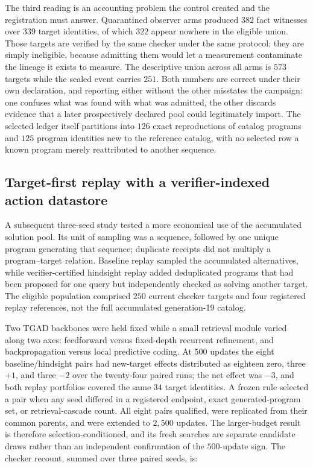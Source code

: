 \documentclass[11pt]{article}
\begin{document}
The third reading is an accounting problem the control created and the registration must
answer. Quarantined observer arms produced $382$ fact witnesses over $339$ target
identities, of which $322$ appear nowhere in the eligible union. Those targets are
verified by the same checker under the same protocol; they are simply ineligible, because
admitting them would let a measurement contaminate the lineage it exists to measure. The
descriptive union across all arms is $573$ targets while the sealed event carries $251$.
Both numbers are correct under their own declaration, and reporting either without the
other misstates the campaign: one confuses what was found with what was admitted, the
other discards evidence that a later prospectively declared pool could legitimately
import. The selected ledger itself partitions into $126$ exact reproductions of catalog
programs and $125$ program identities new to the reference catalog, with no selected row a
known program merely reattributed to another sequence.

\subsection{Target-first replay with a verifier-indexed action datastore}
\label{sec:action-datastore-replay}

A subsequent three-seed study tested a more economical use of the accumulated solution
pool.  Its unit of sampling was a sequence, followed by one unique program generating that
sequence; duplicate receipts did not multiply a program--target relation.  Baseline replay
sampled the accumulated alternatives, while verifier-certified hindsight replay added
deduplicated programs that had been proposed for one query but independently checked as
solving another target.  The eligible population comprised $250$ current checker targets
and four registered replay references, not the full accumulated generation-19 catalog.

Two TGAD backbones were held fixed while a small retrieval module varied along two axes:
feedforward versus fixed-depth recurrent refinement, and backpropagation versus local
predictive coding.  At $500$ updates the eight baseline/hindsight pairs had new-target
effects distributed as eighteen zero, three $+1$, and three $-2$ over the twenty-four
paired runs; the net effect was $-3$, and both replay portfolios covered the same $34$
target identities.  A frozen rule selected a pair when any seed differed in a registered
endpoint, exact generated-program set, or retrieval-cascade count.  All eight pairs
qualified, were replicated from their common parents, and were extended to $2{,}500$
updates.  The larger-budget result is therefore selection-conditioned, and its fresh
searches are separate candidate draws rather than an independent confirmation of the
$500$-update sign.  The checker recount, summed over three paired seeds, is:
\end{document}
